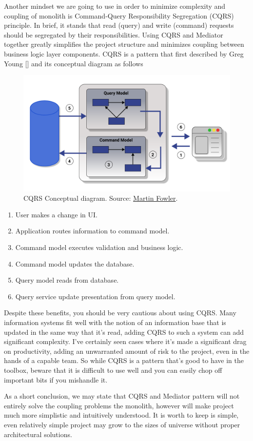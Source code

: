 Another mindset we are going to use in order to minimize complexity and coupling of monolith is Command-Query
Responsibility Segregation (CQRS) principle.
In brief, it stands that read (query) and write (command) requests should be segregated by their responsibilities.
Using CQRS and Mediator together greatly simplifies the project structure and minimizes coupling between business
logic layer components.
CQRS is a pattern that first described by Greg Young [\cite{young2010cqrs}] and its conceptual diagram as follows

\begin{figure}[H]
    \centering
    \includegraphics[width=1\textwidth]{Pictures/cqrs.pdf}
    \caption{CQRS Conceptual diagram.
    Source: \href{https://martinfowler.com/bliki/CQRS.html}{Martin Fowler}.}
    \label{fig:figure}
\end{figure}

\begin{enumerate}
    \item User makes a change in UI\@.
    \item Application routes information to command model.
    \item Command model executes validation and business logic.
    \item Command model updates the database.
    \item Query model reads from database.
    \item Query service update presentation from query model.
\end{enumerate}

Despite these benefits, you should be very cautious about using CQRS\@.
Many information systems fit well with the notion of an information base that is updated in the same way that it's read,
adding CQRS to such a system can add significant complexity.
I've certainly seen cases where it's made a significant drag on productivity, adding an unwarranted amount of risk to the
project, even in the hands of a capable team.
So while CQRS is a pattern that's good to have in the toolbox, beware that it is difficult to use well and you can easily
chop off important bits if you mishandle it.

As a short conclusion, we may state that CQRS and Mediator pattern will not entirely solve the coupling problems the monolith,
however will make project much more simplistic and intuitively understood.
It is worth to keep is simple,
even relatively simple project may grow to the sizes of universe without proper architectural solutions.
